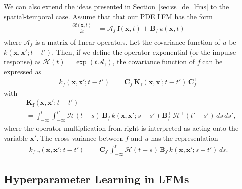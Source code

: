 \documentclass[journal]{IEEEtran}
\begin{document}
We can also extend the ideas presented in Section~\ref{sec:ss_de_lfms} to the spatial-temporal case.  Assume that that our PDE LFM has the form
%
\begin{equation}
\begin{split}
  \frac{\partial \mathbf{f}(\mathbf{x},t)}{\partial t}
  &= \mathbf{\mathcal{A}}_f \, \mathbf{f}(\mathbf{x},t) + \mathbf{B}_f \, u(\mathbf{x},t) \\
\end{split}
\end{equation}
%
where $\mathbf{\mathcal{A}}_f$ is a matrix of linear operators. Let the covariance function of $u$ be $k(\mathbf{x},\mathbf{x}';t - t')$. Then, if we define the operator exponential (or the impulse response) as $\mathbf{\mathcal{H}}(t) = \exp(t \, \mathbf{\mathcal{A}_f})$, the covariance function of $f$ can be expressed as
%
\begin{equation}
\begin{split}
  k_f(\mathbf{x},\mathbf{x}';t-t') &=
  \mathbf{C}_f \, \mathbf{K}_\mathbf{f}(\mathbf{x},\mathbf{x}';t-t') \, \mathbf{C}_f^{\top}
\end{split}
\end{equation}
%
with
%
\begin{equation}
\begin{split}
  &\mathbf{K}_\mathbf{f}(\mathbf{x},\mathbf{x}';t-t')
  \\ &
  =
  \int_{-\infty}^{t} \int_{-\infty}^{t'}
  \mathbf{\mathcal{H}}(t - s) \, \mathbf{B}_f \, k(\mathbf{x},\mathbf{x}';s - s') \,
  \mathbf{B}_f^{\top} \, \mathbf{\mathcal{H}}^{\top}(t' - s') \, ds \, ds',
\end{split}
\label{eq:vfcov_pde}
\end{equation}
%
where the operator multiplication from right is interpreted as acting onto the variable $\mathbf{x}'$. The cross-variance between $f$ and $u$ has the representation
%
\begin{equation}
\begin{split}
  k_{f,u}(\mathbf{x},\mathbf{x}';t-t') &=
  \mathbf{C}_f \, 
  \int_{-\infty}^{t}
  \mathbf{\mathcal{H}}(t - s) \, \mathbf{B}_f \, k(\mathbf{x},\mathbf{x}';s - t') \, ds.
\end{split}
\end{equation}

\subsection{Hyperparameter Learning in LFMs}
\end{document}
